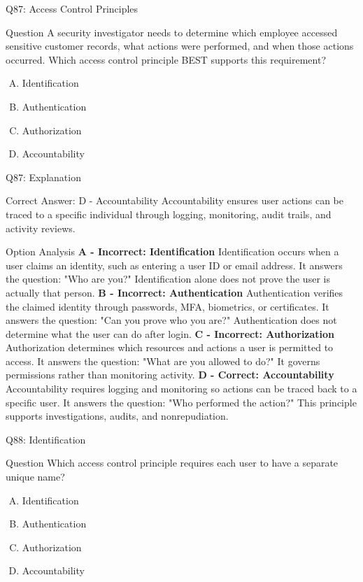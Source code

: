 \documentclass{beamer}
\begin{document}
	
	\begin{frame}{Q87: Access Control Principles} \begin{block}{Question} A security investigator needs to determine which employee accessed sensitive customer records, what actions were performed, and when those actions occurred. Which access control principle BEST supports this requirement? \end{block} \begin{enumerate}[(A)] \item Identification \item Authentication \item Authorization \item Accountability \end{enumerate}  \end{frame} \begin{frame}{Q87: Explanation} \footnotesize \begin{block}{Correct Answer: D - Accountability} Accountability ensures user actions can be traced to a specific individual through logging, monitoring, audit trails, and activity reviews. \end{block} \begin{block}{Option Analysis} \textbf{A - Incorrect: Identification} Identification occurs when a user claims an identity, such as entering a user ID or email address. It answers the question: "Who are you?" Identification alone does not prove the user is actually that person. \vspace{0.15cm} \textbf{B - Incorrect: Authentication} Authentication verifies the claimed identity through passwords, MFA, biometrics, or certificates. It answers the question: "Can you prove who you are?" Authentication does not determine what the user can do after login. \vspace{0.15cm} \textbf{C - Incorrect: Authorization} Authorization determines which resources and actions a user is permitted to access. It answers the question: "What are you allowed to do?" It governs permissions rather than monitoring activity. \vspace{0.15cm} \textbf{D - Correct: Accountability} Accountability requires logging and monitoring so actions can be traced back to a specific user. It answers the question: "Who performed the action?" This principle supports investigations, audits, and nonrepudiation. \end{block}  \end{frame}
	
	\begin{frame}{Q88: Identification}
		\begin{block}{Question}
			Which access control principle requires each user to have a separate unique name?
		\end{block}
		\begin{enumerate}[(A)]
			\item Identification
			\item Authentication
			\item Authorization
			\item Accountability
		\end{enumerate}
	\end{frame}
	
\end{document}
